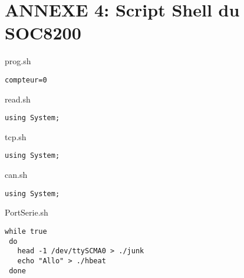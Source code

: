 \section{ANNEXE 4: Script Shell du SOC8200}
\begin{center}\HRule \end{center}
\begin{center}
prog.sh
\end{center}
\begin{lstlisting}
compteur=0  
\end{lstlisting}





\begin{center}\HRule \end{center}
\begin{center}
read.sh
\end{center}
\begin{lstlisting}
using System;
\end{lstlisting}





\begin{center}\HRule \end{center}
\begin{center}
tcp.sh
\end{center}
\begin{lstlisting}
using System;
\end{lstlisting}






\begin{center}\HRule \end{center}
\begin{center}
can.sh
\end{center}
\begin{lstlisting}
using System;
\end{lstlisting}





\begin{center}\HRule \end{center}
\begin{center}
PortSerie.sh
\end{center}
\begin{lstlisting}
while true
 do
   head -1 /dev/ttySCMA0 > ./junk
   echo "Allo" > ./hbeat
 done 
\end{lstlisting}




